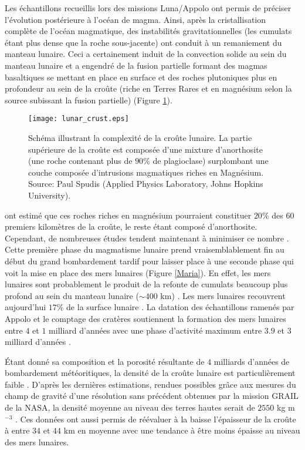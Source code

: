 Les échantillons recueillis lors des missions Luna/Appolo ont permis
de préciser l'évolution postérieure à l'océan de magma. Ainsi, après
la cristallisation complète de l'océan magmatique, des instabilités
gravitationnelles (les cumulats étant plus dense que la roche
sous-jacente) ont conduit à un remaniement du manteau lunaire. Ceci a
certainement induit de la convection solide au sein du manteau lunaire
et a engendré de la fusion partielle formant des magmas basaltiques se
mettant en place en surface et des roches plutoniques plus en
profondeur au sein de la croûte (riche en Terres Rares et en magnésium
selon la source subissant la fusion partielle) \citep{Shearer:2006gg}
(Figure \ref{C1-LunarCrust}).
\begin{figure}[h!]
 \begin{center}
 \graphicspath{ {/Users/thorey/Documents/These/Manuscript/Figure/Chapter1/} }
 \texttt{[image: lunar\_crust.eps]}
 \caption{Schéma illustrant la complexité de la croûte lunaire. La
 partie supérieure de la croûte est composée d'une mixture
 d'anorthosite (une roche contenant plus de $90\%$ de
 plagioclase) surplombant une couche composée d'intrusions
 magmatiques riches en Magnésium. Source: Paul Spudis (Applied
 Physics Laboratory, Johns Hopkins University).}
 \label{C1-LunarCrust}
 \end{center}
\end{figure}
\citet{Taylor:1982hx} ont estimé que ces roches riches en magnésium
pourraient constituer $20\%$ des $60$ premiers kilomètres de la
croûte, le reste étant composé d'anorthosite. Cependant, de
nombreuses études tendent maintenant à minimiser ce nombre
\citep{Jolliff:2000vf}. Cette première phase du magmatisme lunaire
prend vraisemblablement fin au début du grand bombardement tardif pour
laisser place à une seconde phase qui voit la mise en place des mers
lunaires (Figure \ref{Maria}). En effet, les mers lunaires sont
probablement le produit de la refonte de cumulats beaucoup plus
profond au sein du manteau lunaire ($\sim 400$ km)
\citep{Shearer:2006gg}. Les mers lunaires recouvrent aujourd'hui
$17\%$ de la surface lunaire \citep{Hiesinger:2006cb}. La datation
des échantillons ramenés par Appolo et le comptage des cratères
soutiennent la formation des mers lunaires entre $4$ et $1$ milliard
d'années avec une phase d'activité maximum entre $3.9$ et $3$ milliard
d'années \citep{Hiesinger:2010ke}.
 
Étant donné sa composition et la porosité résultante de $4$ milliards
d'années de bombardement météoritiques, la densité de la croûte
lunaire est particulièrement faible \citep{Huang:2012gf,Han:2014ic}.
D'après les dernières estimations, rendues possibles grâce aux mesures
du champ de gravité d'une résolution sans précédent obtenues par la
mission GRAIL de la NASA, la densité moyenne au niveau des terres
hautes serait de $2550$ kg m$^{-3}$ \citep{Wieczorek:2013ipa}. Ces
données ont aussi permis de réévaluer à la baisse l'épaisseur de la
croûte à entre $34$ et $44$ km en moyenne avec une tendance à être
moins épaisse au niveau des mers lunaires.

